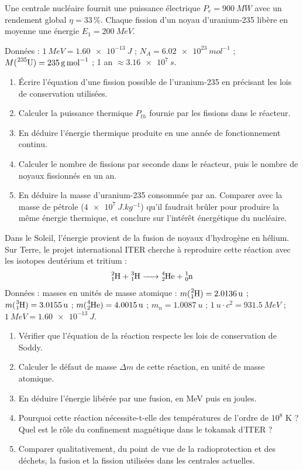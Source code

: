\documentclass[11pt]{article}
\begin{document}
\begin{exercice}
Une centrale nucléaire fournit une puissance électrique $P_e = \SI{900}{MW}$ avec un rendement global $\eta = 33\,\%$. Chaque fission d'un noyau d'uranium-235 libère en moyenne une énergie $E_1 = \SI{200}{MeV}$.

Données : $\SI{1}{MeV} = \SI{1,60e-13}{J}$ ; $N_A = \SI{6,02e23}{mol^{-1}}$ ; $M(\ce{^{235}U}) = \SI{235}{g.mol^{-1}}$ ; 1 an $\approx \SI{3,16e7}{s}$.
\begin{enumerate}
\item Écrire l'équation d'une fission possible de l'uranium-235 en précisant les lois de conservation utilisées.
\item Calculer la puissance thermique $P_{th}$ fournie par les fissions dans le réacteur.
\item En déduire l'énergie thermique produite en une année de fonctionnement continu.
\item Calculer le nombre de fissions par seconde dans le réacteur, puis le nombre de noyaux fissionnés en un an.
\item En déduire la masse d'uranium-235 consommée par an. Comparer avec la masse de pétrole ($\SI{4e7}{J.kg^{-1}}$) qu'il faudrait brûler pour produire la même énergie thermique, et conclure sur l'intérêt énergétique du nucléaire.
\end{enumerate}
\end{exercice}

\begin{exercice}
Dans le Soleil, l'énergie provient de la fusion de noyaux d'hydrogène en hélium. Sur Terre, le projet international ITER cherche à reproduire cette réaction avec les isotopes deutérium et tritium :
\[ \ce{^{2}_{1}H + ^{3}_{1}H -> ^{4}_{2}He + ^{1}_{0}n} \]
Données : masses en unités de masse atomique : $m(\ce{^{2}_{1}H}) = \SI{2,0136}{u}$ ; $m(\ce{^{3}_{1}H}) = \SI{3,0155}{u}$ ; $m(\ce{^{4}_{2}He}) = \SI{4,0015}{u}$ ; $m_n = \SI{1,0087}{u}$ ; $\SI{1}{u} \cdot c^2 = \SI{931,5}{MeV}$ ; $\SI{1}{MeV} = \SI{1,60e-13}{J}$.
\begin{enumerate}
\item Vérifier que l'équation de la réaction respecte les lois de conservation de Soddy.
\item Calculer le défaut de masse $\Delta m$ de cette réaction, en unité de masse atomique.
\item En déduire l'énergie libérée par une fusion, en MeV puis en joules.
\item Pourquoi cette réaction nécessite-t-elle des températures de l'ordre de $10^8$ K ? Quel est le rôle du confinement magnétique dans le tokamak d'ITER ?
\item Comparer qualitativement, du point de vue de la radioprotection et des déchets, la fusion et la fission utilisées dans les centrales actuelles.
\end{enumerate}
\end{exercice}
\end{document}
